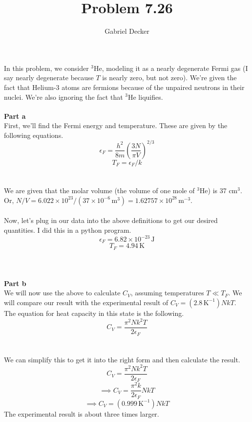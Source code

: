 \documentclass[12pt]{article}
\title{Problem 7.26}
\author{Gabriel Decker}
\newcommand{\avogadro}{6.022\times10^{23}}
\begin{document}
\maketitle
\begin{flushleft}


In this problem, we consider ${}^3\text{He}$, modeling it as a nearly degenerate Fermi gas (I say nearly degenerate because $T$ is nearly zero, but not zero).
We're given the fact that Helium-3 atoms are fermions because of the unpaired neutrons in their nuclei.
We're also ignoring the fact that ${}^3\text{He}$ liquifies.\\~\\

\textbf{Part a}\\
First, we'll find the Fermi energy and temperature.
These are given by the following equations.
\begin{equation}
    \epsilon_F=\frac{h^2}{8m}\left(\frac{3N}{\pi V}\right)^{2/3}
\end{equation}
\begin{equation}
    T_F=\epsilon_F/k
\end{equation}\\~\\

We are given that the molar volume (the volume of one mole of ${}^3\text{He}$) is 37 cm$^3$.
Or, $N/V=\avogadro/(37\times10^{-6}\,\text{m}^3)=1.62757\times10^{28}\,\text{m}^{-3}$.\\~\\

Now, let's plug in our data into the above definitions to get our desired quantities.
I did this in a python program.
$$\epsilon_F=6.82\times10^{-23}\,\text{J}$$
$$T_F=4.94\,\text{K}$$\\~\\~\\




\textbf{Part b}\\
We will now use the above to calculate $C_V$, assuming temperatures $T\ll T_F$.
We will compare our result with the experimental result of $C_V=(2.8\,\text{K}^{-1})NkT$.
The equation for heat capacity in this state is the following.
\begin{equation}
    C_V=\frac{\pi^2 Nk^2 T}{2\epsilon_F}
\end{equation}\\~\\

We can simplify this to get it into the right form and then calculate the result.
$$C_V=\frac{\pi^2 Nk^2 T}{2\epsilon_F}$$
$$\implies C_V=\frac{\pi^2k}{2\epsilon_F}NkT$$
$$\implies C_V=(0.999\,\text{K}^{-1})NkT$$
The experimental result is about three times larger.\\~\\~\\






\end{flushleft}
\end{document}
